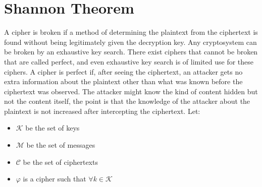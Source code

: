 \section{Shannon Theorem}

A cipher is broken if a method of determining the plaintext from the ciphertext is found without being legitimately given the decryption key. Any cryptosystem can be broken by an exhaustive key search. There exist ciphers that cannot be broken that are called perfect, and even exhaustive key search is of limited use for these ciphers.
A cipher is perfect if, after seeing the ciphertext, an attacker gets no extra information about the plaintext other than what was known before the ciphertext was observed. The attacker might know the kind of content hidden but not the content itself, the point is that the knowledge of the attacker about the plaintext is not increased after intercepting the ciphertext.
Let:
\begin{itemize}
	\item $\mathcal{K}$ be the set of keys
	\item $\mathcal{M}$ be the set of messages
	\item $\mathcal{C}$ be the set of ciphertexts
	\item $\varphi$ is a cipher such that $\forall k \in \mathcal{K}$
\end{itemize} 

